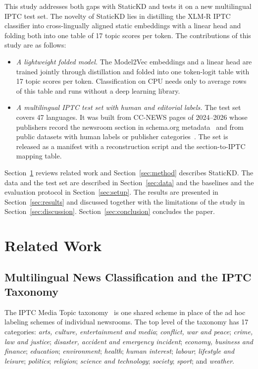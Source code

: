 \documentclass{ieeeaccess}
\begin{document}
This study addresses both gaps with StaticKD and tests it on a new multilingual IPTC test set. The novelty of StaticKD lies in distilling the XLM-R IPTC classifier into cross-lingually aligned static embeddings with a linear head and folding both into one table of 17 topic scores per token. The contributions of this study are as follows:
\begin{itemize}
  \item \emph{A lightweight folded model.} The Model2Vec embeddings and a linear head are trained jointly through distillation and folded into one token-logit table with 17 topic scores per token. Classification on CPU needs only to average rows of this table and runs without a deep learning library.
  \item \emph{A multilingual IPTC test set with human and editorial labels.} The test set covers 47 languages. It was built from CC-NEWS pages of 2024--2026 whose publishers record the newsroom section in schema.org metadata~\cite{guha2016schema} and from public datasets with human labels or publisher categories~\cite{adelani2023masakhanews,petukhova2023mnds,mirashi2023indicnews,hossain2025banglanews,indonews2021}. The set is released as a manifest with a reconstruction script and the section-to-IPTC mapping table.
\end{itemize}

Section~\ref{sec:related} reviews related work and Section~\ref{sec:method} describes StaticKD. The data and the test set are described in Section~\ref{sec:data} and the baselines and the evaluation protocol in Section~\ref{sec:setup}. The results are presented in Section~\ref{sec:results} and discussed together with the limitations of the study in Section~\ref{sec:discussion}. Section~\ref{sec:conclusion} concludes the paper.

\section{Related Work}
\label{sec:related}
\subsection{Multilingual News Classification and the IPTC Taxonomy}
\label{sec:rw-iptc}
The IPTC Media Topic taxonomy~\cite{iptc2024mediatopics} is one shared scheme in place of the ad hoc labeling schemes of individual newsrooms. The top level of the taxonomy has 17 categories: \emph{arts, culture, entertainment and media}; \emph{conflict, war and peace}; \emph{crime, law and justice}; \emph{disaster, accident and emergency incident}; \emph{economy, business and finance}; \emph{education}; \emph{environment}; \emph{health}; \emph{human interest}; \emph{labour}; \emph{lifestyle and leisure}; \emph{politics}; \emph{religion}; \emph{science and technology}; \emph{society}; \emph{sport}; and \emph{weather}.
\end{document}
